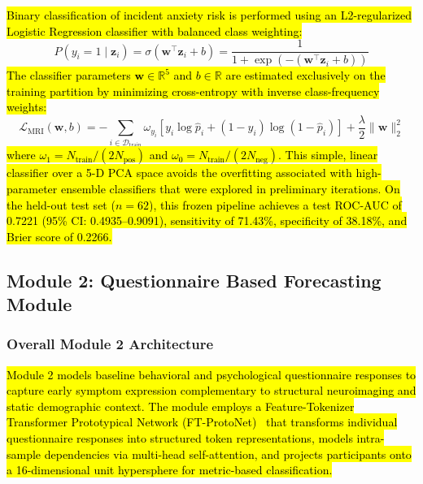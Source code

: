 \documentclass[10pt,letterpaper]{article}
\begin{document}
        \hl{Binary classification of incident anxiety risk is performed using an L2-regularized Logistic Regression classifier with balanced class weighting:}
        \begin{equation} \label{eq:logreg}
        P(y_i = 1 \mid \mathbf{z}_i) = \sigma(\mathbf{w}^\top \mathbf{z}_i + b) = \frac{1}{1 + \exp(-(\mathbf{w}^\top \mathbf{z}_i + b))}
        \end{equation}
        \hl{The classifier parameters $\mathbf{w} \in \mathbb{R}^5$ and $b \in \mathbb{R}$ are estimated exclusively on the training partition by minimizing cross-entropy with inverse class-frequency weights:}
        \begin{equation} \label{eq:mri_loss}
        \mathcal{L}_{\text{MRI}}(\mathbf{w}, b) = -\sum_{i \in \mathcal{D}_{\text{train}}} \omega_{y_i} \left[ y_i \log \hat{p}_i + (1 - y_i) \log(1 - \hat{p}_i) \right] + \frac{\lambda}{2} \|\mathbf{w}\|_2^2
        \end{equation}
        \hl{where $\omega_1 = N_{\text{train}} / (2 N_{\text{pos}})$ and $\omega_0 = N_{\text{train}} / (2 N_{\text{neg}})$. This simple, linear classifier over a 5-D PCA space avoids the overfitting associated with high-parameter ensemble classifiers that were explored in preliminary iterations. On the held-out test set ($n=62$), this frozen pipeline achieves a test ROC-AUC of 0.7221 (95\% CI: 0.4935--0.9091), sensitivity of 71.43\%, specificity of 38.18\%, and Brier score of 0.2266.}

        \subsection*{Module 2: Questionnaire Based Forecasting Module}

        \subsubsection*{\textbf{Overall Module 2 Architecture}}
        \hl{Module 2 models baseline behavioral and psychological questionnaire responses to capture early symptom expression complementary to structural neuroimaging and static demographic context. The module employs a Feature-Tokenizer Transformer Prototypical Network (FT-ProtoNet)~\cite{ref_fttransformer, ref_snell} that transforms individual questionnaire responses into structured token representations, models intra-sample dependencies via multi-head self-attention, and projects participants onto a 16-dimensional unit hypersphere for metric-based classification.}
\end{document}
